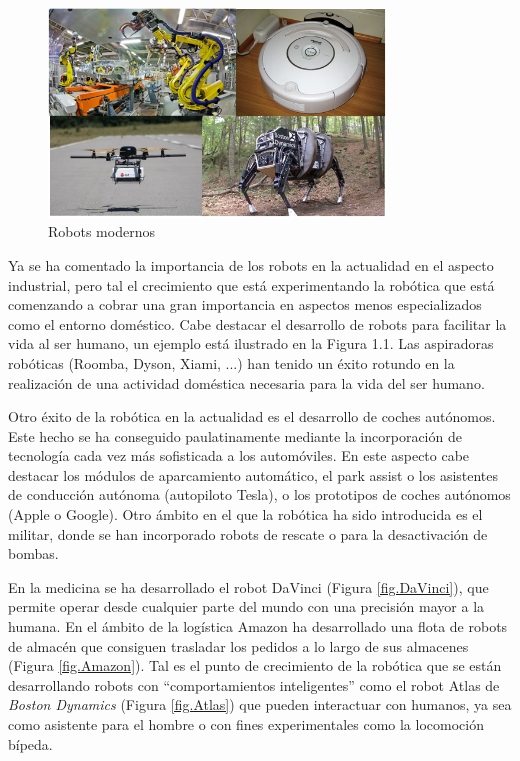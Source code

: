 \begin{figure}[H]
	\begin{center}
		\includegraphics[width=0.8\textwidth]{figures/robots.png}
		\caption{Robots modernos}
		\label{fig.robots}
	\end{center}
\end{figure}

Ya se ha comentado la importancia de los robots en la actualidad en el aspecto industrial, pero tal el crecimiento que está experimentando la robótica que está comenzando a cobrar una gran importancia en aspectos menos especializados como el entorno doméstico. Cabe destacar el desarrollo de robots para facilitar la vida al ser humano, un ejemplo está ilustrado en la Figura 1.1. Las aspiradoras robóticas (Roomba, Dyson, Xiami, ...) han tenido un éxito rotundo en la realización de una actividad doméstica necesaria para la vida del ser humano.

Otro éxito de la robótica en la actualidad es el desarrollo de coches autónomos. Este hecho se ha conseguido paulatinamente mediante la incorporación de tecnología cada vez más sofisticada a los automóviles. En este aspecto cabe destacar los módulos de aparcamiento automático, el park assist o los asistentes de conducción autónoma (autopiloto Tesla), o los prototipos de coches autónomos (Apple o Google). 
Otro ámbito en el que la robótica ha sido introducida es el militar, donde se han incorporado robots de rescate o para la desactivación de bombas. 

En la medicina se ha desarrollado el robot DaVinci (Figura \ref{fig.DaVinci}), que permite operar desde cualquier parte del mundo con una precisión mayor a la humana. En el ámbito de la logística Amazon ha desarrollado una flota de robots de almacén que consiguen trasladar los pedidos a lo largo de sus almacenes (Figura \ref{fig.Amazon}). Tal es el punto de crecimiento de la robótica que se están desarrollando robots con ``comportamientos inteligentes'' como el robot Atlas de \textit{Boston Dynamics} (Figura \ref{fig.Atlas}) que pueden interactuar con humanos, ya sea como asistente para el hombre o con fines experimentales como la locomoción bípeda.


